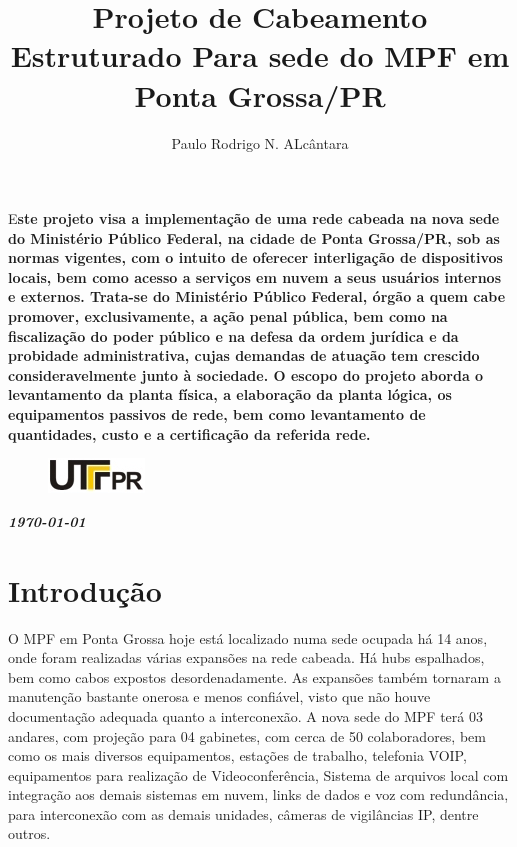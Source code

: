 \documentclass[	DIV=calc,%
							paper=a4,%
							fontsize=12pt,%
							onecolumn]{scrartcl}	 					%
\title{Projeto de Cabeamento Estruturado Para sede do MPF em Ponta Grossa/PR }					%
\author{Paulo Rodrigo N. ALcântara }  	%
\date{}																				%
\newcommand{\initial}[1]{%
     \lettrine[lines=3,lhang=0.3,nindent=0em]{
     				\color{DarkGoldenrod}
     				{\textsf{#1}}}{}}
\begin{document}
\maketitle
\thispagestyle{fancy} 	
\thispagestyle{empty}		%




\initial{E}\textbf{ste projeto visa a implementação de uma rede cabeada na nova sede do Ministério Público Federal, na cidade de Ponta Grossa/PR, sob as normas vigentes, com o intuito de oferecer interligação de dispositivos locais, bem como acesso a serviços em nuvem a seus usuários internos e externos. Trata-se do Ministério Público Federal, órgão a quem cabe promover, exclusivamente, a ação penal pública, bem como na fiscalização do poder público e na defesa da ordem jurídica e da probidade administrativa, cujas demandas de atuação tem crescido consideravelmente junto à sociedade. O escopo do projeto aborda o levantamento da planta física, a elaboração da planta lógica, os equipamentos passivos de rede, bem como levantamento de quantidades, custo e a certificação da referida rede.}

\begin{figure}
	\centering
	\includegraphics{utfpr}
\end{figure}

\vspace{2cm}
\centerline{\textit{\textbf{\today}}}

\clearpage
    \renewcommand*\listfigurename{Lista de figuras}
\listoffigures


\clearpage
\renewcommand{\contentsname}{Sumário}
\tableofcontents
\clearpage

\section{Introdução}
O MPF em Ponta Grossa hoje está localizado numa sede ocupada há 14 anos, onde foram realizadas várias expansões na rede cabeada. Há hubs espalhados, bem como cabos expostos desordenadamente. As expansões também tornaram a manutenção bastante onerosa e menos confiável, visto que não houve documentação adequada quanto a interconexão. A nova sede do MPF terá 03 andares, com projeção para 04 gabinetes, com cerca de 50 colaboradores, bem como os mais diversos equipamentos, estações de trabalho, telefonia VOIP, equipamentos para realização de Videoconferência, Sistema de arquivos local com integração aos demais sistemas em nuvem, links de dados e voz com redundância, para interconexão com as demais unidades, câmeras de vigilâncias IP, dentre outros.
\end{document}
